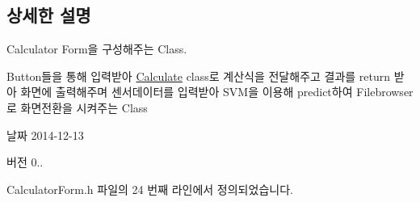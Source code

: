 \subsection{상세한 설명}
Calculator Form을 구성해주는 Class. 

Button들을 통해 입력받아 \hyperlink{class_calculate}{Calculate} class로 계산식을 전달해주고 결과를 return 받아 화면에 출력해주며 센서데이터를 입력받아 S\+V\+M을 이용해 predict하여 Filebrowser로 화면전환을 시켜주는 Class \begin{DoxyDate}{날짜}
2014-\/12-\/13 
\end{DoxyDate}
\begin{DoxyVersion}{버전}
0.. 
\end{DoxyVersion}


Calculator\+Form.\+h 파일의 24 번째 라인에서 정의되었습니다.



